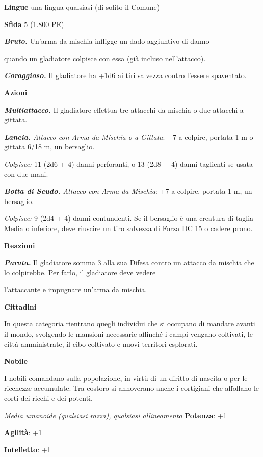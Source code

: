 \begin{multicols}{2}
\textbf{Lingue} una lingua qualsiasi (di solito il Comune)

\textbf{Sfida} 5 (1.800 PE)\smallskip

\emph{\textbf{Bruto.}} Un'arma da mischia infligge un dado aggiuntivo di
danno

quando un gladiatore colpisce con essa (già incluso nell'attacco).

\emph{\textbf{Coraggioso.}} Il gladiatore ha +1d6 ai tiri salvezza
contro l'essere spaventato.

\smallskip\textbf{Azioni}

\emph{\textbf{Multiattacco.}} Il gladiatore effettua tre attacchi da
mischia o due attacchi a gittata.

\emph{\textbf{Lancia.} Attacco con Arma da Mischia o a Gittata}: +7 a
colpire, portata 1 m o gittata 6/18 m, un bersaglio.

\emph{Colpisce:} 11 (2d6 + 4) danni perforanti, o 13 (2d8 + 4) danni
taglienti se usata con due mani.

\emph{\textbf{Botta di Scudo.} Attacco con Arma da Mischia}: +7 a
colpire, portata 1 m, un bersaglio.

\emph{Colpisce:} 9 (2d4 + 4) danni contundenti. Se il bersaglio è una
creatura di taglia Media o inferiore, deve riuscire un tiro salvezza di Forza DC 15 o cadere prono.

\textbf{Reazioni}

\emph{\textbf{Parata.}} Il gladiatore somma 3 alla sua Difesa contro un
attacco da mischia che lo colpirebbe. Per farlo, il gladiatore deve
vedere

l'attaccante e impugnare un'arma da mischia.

\textbf{Cittadini}

In questa categoria rientrano quegli individui che si occupano di
mandare avanti il mondo, svolgendo le mansioni necessarie affinché i
campi vengano coltivati, le città amministrate, il cibo coltivato e
nuovi territori esplorati.

\textbf{Nobile}

I nobili comandano sulla popolazione, in virtù di un diritto di nascita
o per le ricchezze accumulate. Tra costoro si annoverano anche i
cortigiani che affollano le corti dei ricchi e dei potenti.

\emph{Media umanoide (qualsiasi razza), qualsiasi allineamento}
\textbf{Potenza}: +1

\textbf{Agilità}: +1

\textbf{Intelletto}: +1


\end{multicols}
